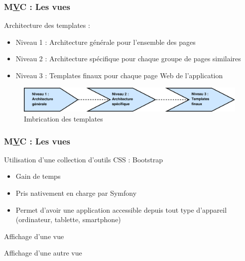 \begin{frame}
\frametitle{M\underline{V}C : Les vues}
Architecture des templates :
\begin{itemize}
\item Niveau 1 : Architecture générale pour l'ensemble des pages
\item Niveau 2 : Architecture spécifique pour chaque groupe de pages similaires
\item Niveau 3 : Templates finaux pour chaque page Web de l'application
\end{itemize}
\begin{figure}[!h]
	\begin{center}
	\includegraphics[scale=0.3]{images/archiTemplates}
	\caption{Imbrication des templates}
	\end{center}
\end{figure}
\end{frame}

\begin{frame}
\frametitle{M\underline{V}C : Les vues}
Utilisation d'une collection d'outils CSS : Bootstrap
\begin{itemize}
\item Gain de temps
\item Pris nativement en charge par Symfony
\item Permet d'avoir une application accessible depuis tout type d'appareil (ordinateur, tablette, smartphone)
\end{itemize}
\end{frame}

\begin{frame}
Affichage d'une vue
\end{frame}

\begin{frame}
Affichage d'une autre vue
\end{frame}